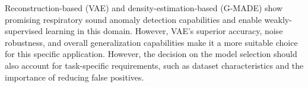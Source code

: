 Reconstruction-based (VAE) and density-estimation-based (G-MADE) show promising respiratory sound anomaly detection capabilities and enable weakly-supervised learning in this domain. However, VAE's superior accuracy, noise robustness, and overall generalization capabilities make it a more suitable choice for this specific application. However, the decision on the model selection should also account for task-specific requirements, such as dataset characteristics and the importance of reducing false positives. 
